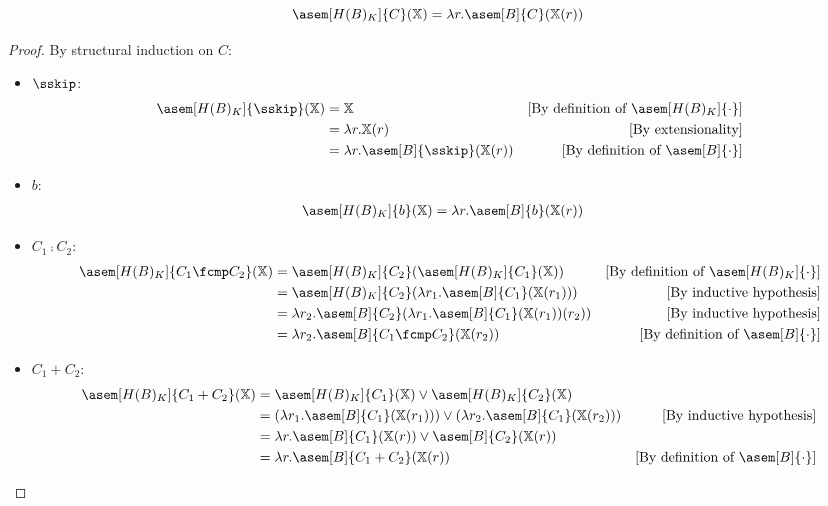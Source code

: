 \begin{theorem}
    \label{thm:hyper-add}
    $$\asem[H(B)_K]{C}(\mathcal{\chi}) = \lambda r . \asem[B]{C}(\chi(r))$$
\end{theorem}
\begin{proof}
  By structural induction on $C$:
  \begin{itemize}
    \item $\sskip$:
      \begin{align*}
        \asem[H(B)_K]{\sskip}(\chi) 
          &= \chi
          &\text{[By definition of $\asem[H(B)_K]{\cdot}$]} \\
          &= \lambda r . \chi(r) 
          &\text{[By extensionality]}\\
          &= \lambda r . \asem[B]{\sskip}(\chi(r))
          &\text{[By definition of $\asem[B]{\cdot}$]} \\
      \end{align*}

    \item $b$:
      \begin{align*}
        \asem[H(B)_K]{b}(\chi) 
          &= \lambda r . \asem[B]{b}(\chi(r))
      \end{align*}

    \item $C_1 \fcmp C_2$:
      \begin{align*}
        \asem[H(B)_K]{C_1 \fcmp C_2}(\chi) 
          &= \asem[H(B)_K]{C_2}(\asem[H(B)_K]{C_1}(\chi))
          &\text{[By definition of $\asem[H(B)_K]{\cdot}$]} \\
          &= \asem[H(B)_K]{C_2}(\lambda r_1 . \asem[B]{C_1}(\chi(r_1)))
          &\text{[By inductive hypothesis]} \\
          &= \lambda r_2 . \asem[B]{C_2}(\lambda r_1 . \asem[B]{C_1}(\chi(r_1))(r_2))
          &\text{[By inductive hypothesis]} \\
          &= \lambda r_2 . \asem[B]{C_1 \fcmp C_2}(\chi(r_2))
          &\text{[By definition of $\asem[B]{\cdot}$]} \\
      \end{align*}

    \item $C_1 + C_2$:
      \begin{align*}
        \asem[H(B)_K]{C_1 + C_2}(\chi)
          &= \asem[H(B)_K]{C_1}(\chi) \lor \asem[H(B)_K]{C_2}(\chi) \\
          &= (\lambda r_1 . \asem[B]{C_1}(\chi(r_1))) \lor (\lambda r_2 . \asem[B]{C_1}(\chi(r_2)))
          &\text{[By inductive hypothesis]} \\
          &= \lambda r . \asem[B]{C_1}(\chi(r)) \lor \asem[B]{C_2}(\chi(r)) \\
          &= \lambda r . \asem[B]{C_1 + C_2}(\chi(r))
          &\text{[By definition of $\asem[B]{\cdot}$]} \\
      \end{align*}


\end{itemize}
\end{proof}
